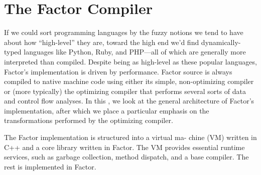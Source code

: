 \section{The Factor Compiler}\label{sec:compiler}

If we could sort programming languages by the fuzzy notions we tend to have
about how ``high-level'' they are, toward the high end we'd find
dynamically-typed languages like Python, Ruby, and PHP---all of which are
generally more interpreted than compiled.  Despite being as high-level as these popular languages, Factor's
implementation is driven by performance.  Factor source is always compiled to
native machine code using either its simple, non-optimizing compiler or (more
typically) the optimizing compiler that performs several sorts of data and
control flow analyses.  In this , we look at the
general architecture of Factor's implementation, after which we place a
particular emphasis on the transformations performed by the optimizing
compiler.


%
%


The Factor implementation is structured into a virtual ma- chine (VM) written
in C++ and a core library written in Factor. The VM provides essential runtime
services, such as garbage collection, method dispatch, and a base compiler.
The rest is implemented in Factor.


